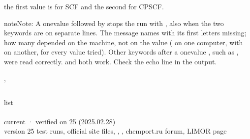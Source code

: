 \documentclass[letterpaper,10pt,english,openany,oneside]{sphinxmanual}
\begin{document}
\sphinxAtStartPar
{} the first value is for SCF and the second for CP\sphinxhyphen{}SCF.

\begin{sphinxadmonition}{note}{Note:}
\sphinxAtStartPar
{} A one\sphinxhyphen{}value 
followed by  stops the run with , also when the
two keywords are on separate lines. The message names  with its first letters missing; how many
depended on the machine, not on the value ( on one computer,  with  on another, for
every value tried). Other keywords after a one\sphinxhyphen{}value , such as , were read correctly.
 and  both work. Check the
 echo line in the output.
\end{sphinxadmonition}

\sphinxAtStartPar
{} {\hyperref[\detokenize{reference/scf:scf-iterations}]{}}, {\hyperref[\detokenize{reference/scf:scf-procedure}]{}}


\subsection{}
\label{\detokenize{reference/scf:iterations}}\label{\detokenize{reference/scf:scf-iterations}}
\ignorespaces 
\sphinxAtStartPar
{} list\\
 \\
 current · verified on 25 (2025.02.28)\\
 version 25 test runs, official site files, , , chemport.ru forum, LIMOR page
\end{document}
